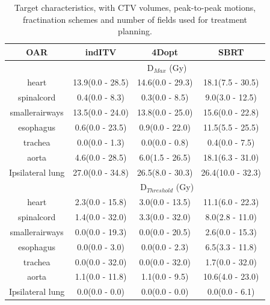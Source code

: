 \begin{table}[H]
	\centering
	\caption{Target characteristics, with CTV volumes, peak-to-peak motions, fractination schemes and number of fields used for treatment planning.}
	\begin{tabular}{c|c|c|c}
		\hline\hline
		 
		OAR &  indITV & 4Dopt & SBRT \\
		\hline
		& \multicolumn{3}{c}{D$_{Max}$ (Gy)}  \\
		\hline
heart & 13.9(0.0 - 28.5) & 14.6(0.0 - 29.3) & 18.1(7.5 - 30.5)\\ 
spinalcord & 0.4(0.0 - 8.3) & 0.3(0.0 - 8.5) & 9.0(3.0 - 12.5)\\ 
smallerairways & 13.5(0.0 - 24.0) & 13.8(0.0 - 25.0) & 15.6(0.0 - 22.8)\\ 
esophagus & 0.6(0.0 - 23.5) & 0.9(0.0 - 22.0) & 11.5(5.5 - 25.5)\\ 
trachea &  0.0(0.0 - 1.3) & 0.0(0.0 - 0.8) & 0.4(0.0 - 7.5)\\ 
aorta &  4.6(0.0 - 28.5) & 6.0(1.5 - 26.5) & 18.1(6.3 - 31.0)\\ 
Ipsilateral lung & 27.0(0.0 - 34.8) & 26.5(8.0 - 30.3) & 26.4(10.0 - 32.3)\\ 

\hline\hline
& \multicolumn{3}{c}{D$_{Threshold}$ (Gy)} \\
\hline

heart &  2.3(0.0 - 15.8) & 3.0(0.0 - 13.5) & 11.1(6.0 - 22.3)\\ 
spinalcord & 1.4(0.0 - 32.0) & 3.3(0.0 - 32.0) & 8.0(2.8 - 11.0)\\ 
smallerairways &  0.0(0.0 - 19.3) & 0.0(0.0 - 20.5) & 2.6(0.0 - 15.3)\\ 
esophagus &  0.0(0.0 - 3.0) & 0.0(0.0 - 2.3) & 6.5(3.3 - 11.8)\\ 
trachea & 0.0(0.0 - 32.0) & 0.0(0.0 - 32.0) & 1.7(0.0 - 32.0)\\ 
aorta & 1.1(0.0 - 11.8) & 1.1(0.0 - 9.5) & 10.6(4.0 - 23.0)\\ 
Ipsilateral lung &  0.0(0.0 - 0.0) & 0.0(0.0 - 0.0) & 0.0(0.0 - 6.1)\\ 
\hline\hline
	\end{tabular}
	\label{tab:OARComplex}
\end{table}

